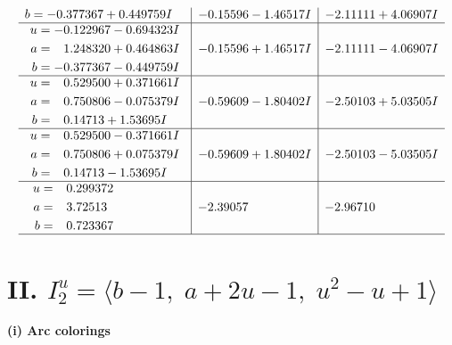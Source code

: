 \documentclass[1p]{elsarticle_modified}
\theoremstyle{definition}
\begin{document}
$$\begin{array}{c|c|c}
\begin{aligned}
b &= -0.377367 + 0.449759 I\end{aligned}
 & -0.15596 - 1.46517 I & -2.11111 + 4.06907 I \\ \hline\begin{aligned}
u &= -0.122967 - 0.694323 I \\
a &= \phantom{-}1.248320 + 0.464863 I \\
b &= -0.377367 - 0.449759 I\end{aligned}
 & -0.15596 + 1.46517 I & -2.11111 - 4.06907 I \\ \hline\begin{aligned}
u &= \phantom{-}0.529500 + 0.371661 I \\
a &= \phantom{-}0.750806 - 0.075379 I \\
b &= \phantom{-}0.14713 + 1.53695 I\end{aligned}
 & -0.59609 - 1.80402 I & -2.50103 + 5.03505 I \\ \hline\begin{aligned}
u &= \phantom{-}0.529500 - 0.371661 I \\
a &= \phantom{-}0.750806 + 0.075379 I \\
b &= \phantom{-}0.14713 - 1.53695 I\end{aligned}
 & -0.59609 + 1.80402 I & -2.50103 - 5.03505 I \\ \hline\begin{aligned}
u &= \phantom{-}0.299372\phantom{ +0.000000I} \\
a &= \phantom{-}3.72513\phantom{ +0.000000I} \\
b &= \phantom{-}0.723367\phantom{ +0.000000I}\end{aligned}
 & -2.39057\phantom{ +0.000000I} & -2.96710\phantom{ +0.000000I}\\
 \hline 
 \end{array}$$\newpage\newpage\renewcommand{\arraystretch}{1}
\centering \section*{II. $I^u_{2}= \langle b-1,\;a+2 u-1,\;u^2- u+1 \rangle$}
\flushleft \textbf{(i) Arc colorings}\\
\end{document}

